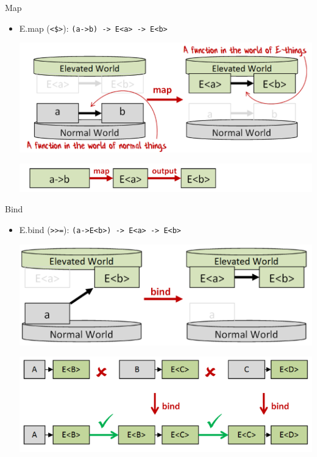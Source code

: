 \documentclass[t]{beamer}
\begin{document}
\begin{frame}[label={sec:org7f7af9c},fragile]{Map}
 \begin{itemize}
\item E.map (\texttt{<\$>}): \texttt{(a->b) -> E<a> -> E<b>}
\begin{center}
\includegraphics[width=.9\linewidth]{./../img/vgfp_map.png}
\end{center}
\begin{center}
\includegraphics[width=.9\linewidth]{./../img/vgfp_map2.png}
\end{center}
\end{itemize}
\end{frame}

\begin{frame}[label={sec:org4e9122b},fragile]{Bind}
 \begin{itemize}
\item E.bind (\texttt{>{}>{}=}): \texttt{(a->E<b>) -> E<a> -> E<b>}
\begin{center}
\includegraphics[width=.9\linewidth]{./../img/vgfp_bind.png}
\end{center}
\begin{center}
\includegraphics[width=.9\linewidth]{./../img/vgfp_bind_composition.png}
\end{center}
\end{itemize}
\end{frame}
\end{document}
